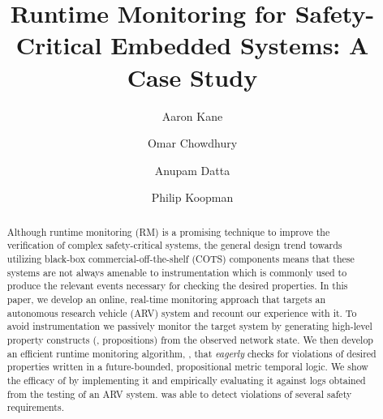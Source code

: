 \documentclass[]{./llncs}
\begin{document}
\title{Runtime Monitoring for Safety-Critical Embedded Systems: A Case Study}


\author{Aaron Kane \and Omar Chowdhury \and Anupam Datta \and Philip Koopman}



\maketitle



\begin{abstract}

Although runtime monitoring (RM) is a promising technique to improve the verification of complex safety-critical systems, 
the general design trend towards utilizing black-box commercial-off-the-shelf (COTS) components means that these systems 
are not always amenable to instrumentation which is commonly used to produce the relevant events necessary for checking 
the desired properties. In this paper, we develop an online, real-time monitoring approach that targets an autonomous research 
vehicle (ARV) system and recount our experience with it. To avoid instrumentation we passively monitor the target system by 
generating high-level property constructs (\ie, propositions) from the observed network state. 
We then develop an efficient runtime monitoring algorithm, \monitor, that \emph{eagerly} checks for violations of desired properties 
written in a future-bounded, propositional metric temporal logic. 
We show the efficacy of \monitor by implementing it and empirically evaluating it against logs obtained from 
the testing of an ARV system. \monitor was able to detect violations of several safety requirements.




\end{abstract}
\end{document}
